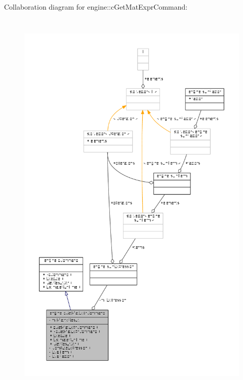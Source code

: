 Collaboration diagram for engine\-:\-:c\-Get\-Mat\-Expr\-Command\-:
\nopagebreak
\begin{figure}[H]
\begin{center}
\leavevmode
\includegraphics[height=550pt]{classengine_1_1cGetMatExprCommand__coll__graph}
\end{center}
\end{figure}
